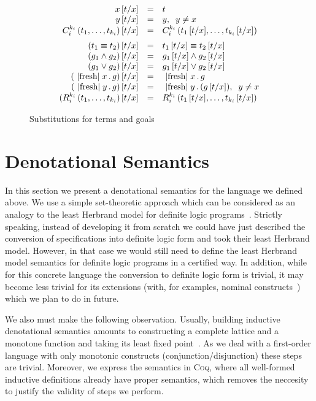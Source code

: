 \begin{figure}[t]
\[
\begin{array}{rcl}
  x\,[t/x] &=& t \\
  y\,[t/x] &=& y,\;\; y\ne x\\
  C_i^{k_i}\,(t_1,\dots,t_{k_i})\,[t/x]&=&C_i^{k_i}\,(t_1\,[t/x],\dots,t_{k_i}\,[t/x])\\[2mm]
  (t_1 \equiv t_2)\,[t/x]&=&t_1\,[t/x] \equiv t_2\,[t/x]\\
  (g_1 \wedge g_2)\,[t/x]&=&g_1\,[t/x] \wedge g_2\,[t/x]\\
  (g_1 \vee g_2)\,[t/x]&=&g_1\,[t/x] \vee g_2\,[t/x]\\
  (\mbox{\lstinline|fresh|}\;x\,.\,g)\,[t/x]&=&\mbox{\lstinline|fresh|}\;x\,.\,g\\
  (\mbox{\lstinline|fresh|}\;y\,.\,g)\,[t/x]&=&\mbox{\lstinline|fresh|}\;y\,.\,(g\,[t/x]),\;\;y\ne x\\
  (R_i^{k_i}\,(t_1,\dots,t_{k_i})\,[t/x]&=&R_i^{k_i}\,(t_1\,[t/x],\dots,t_{k_i}\,[t/x])
\end{array}
\]
  \caption{Substitutions for terms and goals}
  \label{substitution}
\end{figure}

\section{Denotational Semantics}
\label{denotational}

In this section we present a denotational semantics for the language we defined above. We use a simple set-theoretic
approach which can be considered as an analogy to the least Herbrand model for definite logic programs~\cite{LHM}.
Strictly speaking, instead of developing it from scratch we could have just described the conversion of specifications
into definite logic form and took their least Herbrand model. However, in that case we would still need to define
the least Herbrand model semantics for definite logic programs in a certified way. In addition, while for
this concrete language the conversion to definite logic form is trivial, it may become less trivial for
its extensions (with, for examples, nominal constructs~\cite{AlphaKanren}) which we plan to do in future.

We also must make the following observation. Usually, building inductive denotational semantics amounts to
constructing a complete lattice and a monotone function and taking its least fixed point~\cite{TarskiKnaster}.
As we deal with a first-order language with only monotonic constructs (conjunction/disjunction) these steps
are trivial. Moreover, we express the semantics in \textsc{Coq}, where all well-formed inductive definitions already
have proper semantics, which removes the neccesity to justify the validity of steps we perform.

